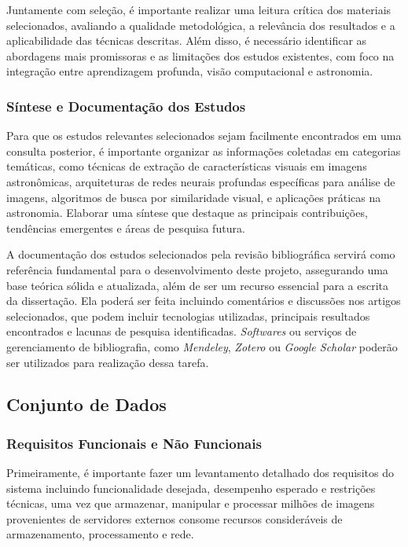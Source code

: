 \documentclass[a4,12pt]{horizon-theme}
\begin{document}
Juntamente com seleção, é importante realizar uma leitura crítica dos materiais selecionados, avaliando a qualidade metodológica, a relevância dos resultados e a aplicabilidade das técnicas descritas. Além disso, é necessário identificar as abordagens mais promissoras e as limitações dos estudos existentes, com foco na integração entre aprendizagem profunda, visão computacional e astronomia.


\subsubsection{Síntese e Documentação dos Estudos}
Para que os estudos relevantes selecionados sejam facilmente encontrados em uma consulta posterior, é importante organizar as informações coletadas em categorias temáticas, como técnicas de extração de características visuais em imagens astronômicas, arquiteturas de redes neurais profundas específicas para análise de imagens, algoritmos de busca por similaridade visual, e aplicações práticas na astronomia. Elaborar uma síntese que destaque as principais contribuições, tendências emergentes e áreas de pesquisa futura.


A documentação dos estudos selecionados pela revisão bibliográfica servirá como referência fundamental para o desenvolvimento deste projeto, assegurando uma base teórica sólida e atualizada, além de ser um recurso essencial para a escrita da dissertação. Ela poderá ser feita incluindo comentários e discussões nos artigos selecionados, que podem incluir tecnologias utilizadas, principais resultados encontrados e lacunas de pesquisa identificadas. \emph{Softwares} ou serviços de gerenciamento de bibliografia, como \emph{Mendeley}, \emph{Zotero} ou \emph{Google Scholar} poderão ser utilizados para realização dessa tarefa.

\newpage
\subsection{Conjunto de Dados}
\label{sec:preparacao}
\subsubsection{Requisitos Funcionais e Não Funcionais}
\label{sec:requisitos}
Primeiramente, é importante fazer um levantamento detalhado dos requisitos do sistema incluindo funcionalidade desejada, desempenho esperado e restrições técnicas, uma vez que armazenar, manipular e processar milhões de imagens provenientes de servidores externos consome recursos consideráveis de armazenamento, processamento e rede.
\end{document}
